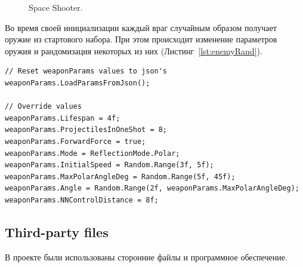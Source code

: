 \begin{figure}[ht]
    \begin{center}

        \caption{
            \label{SpaceShooter}
            Space Shooter.
        }
    \end {center}
\end {figure}

Во время своей инициализации каждый враг случайным образом получает оружие из стартового набора. При этом происходит изменение параметров оружия и рандомизация некоторых из них (Листинг~\ref{lst:enemyRand}).

\begin{lstlisting}[name=enemyRand, caption={Инициализация параметров вражеского оружия}, label={lst:enemyRand}]
// Reset weaponParams values to json's
weaponParams.LoadParamsFromJson();

// Override values
weaponParams.Lifespan = 4f;
weaponParams.ProjectilesInOneShot = 8;
weaponParams.ForwardForce = true;
weaponParams.Mode = ReflectionMode.Polar;
weaponParams.InitialSpeed = Random.Range(3f, 5f);
weaponParams.MaxPolarAngleDeg = Random.Range(5f, 45f);
weaponParams.Angle = Random.Range(2f, weaponParams.MaxPolarAngleDeg);
weaponParams.NNControlDistance = 8f;
\end{lstlisting}

\pagebreak

\subsection{Third-party files}

В проекте были использованы сторонние файлы и программное обеспечение.

